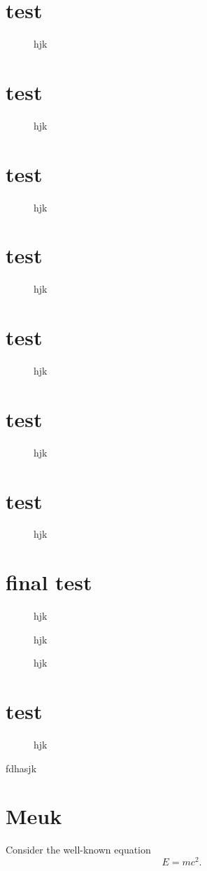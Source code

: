 \documentclass[natbib]{muthesis}
\newcommand{\bfig}{\begin{figure}}
\newcommand{\efig}{\end{figure}}
\begin{document}
\chapter{test}
\bfig
\vspace{2cm}
\caption{hjk}
\efig
\chapter{test}
\bfig
\vspace{2cm}
\caption{hjk}
\efig
\chapter{test}
\bfig
\vspace{2cm}
\caption{hjk}
\efig
\chapter{test}
\bfig
\vspace{2cm}
\caption{hjk}
\efig
\chapter{test}
\bfig
\vspace{2cm}
\caption{hjk}
\efig
\chapter{test}
\bfig
\vspace{2cm}
\caption{hjk}
\efig
\chapter{test}
\bfig
\vspace{2cm}
\caption{hjk}
\efig
\chapter{final test}
\bfig
\vspace{2cm}
\caption{hjk}
\efig
\newpage\mbox{}
\bfig
\vspace{2cm}
\caption{hjk}
\efig
\newpage\mbox{}
\bfig
\vspace{2cm}
\caption{hjk}
\efig
\newpage\mbox{}
\chapter{test}
\bfig
\vspace{2cm}
\caption{hjk}
\efig
\noindent
fdhasjk
%
\appendix
\chapter{Meuk}
Consider the well-known equation
\begin{equation}
E=mc^2.
\end{equation}
\biography
\end{document}
